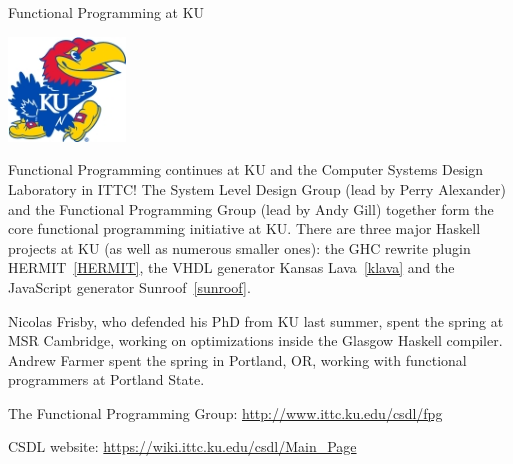 \begin{hcarentry}[section]{Functional Programming at KU}
\label{ukansas}
\makeheader

\begin{center}
\includegraphics[width=0.235\textwidth]{html/jh2.jpg}
\end{center}

Functional Programming continues at KU and
the Computer Systems Design Laboratory in ITTC!
The System Level Design Group (lead by Perry Alexander)
and the Functional Programming Group (lead by Andy Gill)
together form the core functional programming initiative at KU.
There are three major Haskell projects at KU (as
well as numerous smaller ones):
the GHC rewrite plugin HERMIT~\cref{HERMIT},
the VHDL generator Kansas Lava~\cref{klava} and
the JavaScript generator Sunroof~\cref{sunroof}.

Nicolas Frisby, who defended his PhD from KU last summer,
spent the spring at MSR Cambridge, working on optimizations
inside the Glasgow Haskell compiler.
Andrew Farmer spent the spring in Portland, OR, working
with functional programmers at Portland State.

\FurtherReading
\begin{compactitem}
\item   The Functional Programming Group:
    \url{http://www.ittc.ku.edu/csdl/fpg}
\item
  CSDL website: \url{https://wiki.ittc.ku.edu/csdl/Main\_Page}
\end{compactitem}
\end{hcarentry}
